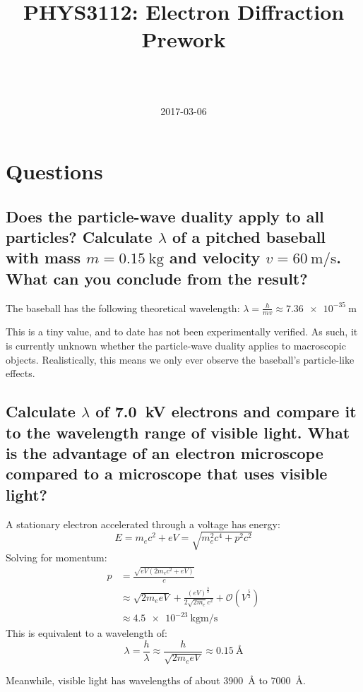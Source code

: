 \documentclass[a4paper]{scrartcl}
\begin{document}
\title{PHYS3112: Electron Diffraction Prework}
\author{ \\ \\ }
\date{2017-03-06}
\maketitle

\section{Questions}
\subsection{Does the particle-wave duality apply to all particles? Calculate \(\lambda\) of a pitched baseball with mass \(m = \SI{0.15}{\kilo\gram}\) and velocity \(v = \SI{60}{\metre\per\second}\). What can you conclude from the result?}
The baseball has the following theoretical wavelength: \(\lambda = \frac{h}{m v} \approx \SI{7.36e-35}{\metre}\)

This is a tiny value, and to date has not been experimentally verified. As such, it is currently unknown whether the particle-wave duality applies to macroscopic objects. Realistically, this means we only ever observe the baseball's particle-like effects.

\subsection{Calculate \(\lambda\) of \SI{7.0}{\kilo\volt} electrons and compare it to the wavelength range of visible light. What is the advantage of an electron microscope compared to a microscope that uses visible light?}
A stationary electron accelerated through a voltage has energy:
\[E = m_e c^2 + e V = \sqrt{m_e^2 c^4 + p^2 c^2}\]
Solving for momentum:
\begin{align*}
    p &= \frac{\sqrt{e V (2 m_e c^2 + e V)}}{c} \\
    &\approx \sqrt{2 m_e e V} + \frac{(e V)^\frac{3}{2}}{2 \sqrt{2 m_e} c^2} + \mathcal{O}\left(V^\frac{5}{2}\right) \\
    &\approx \SI{4.5e-23}{\kilo\gram\metre\per\second}
\end{align*}
This is equivalent to a wavelength of:
\[\lambda = \frac{h}{\lambda} \approx \frac{h}{\sqrt{2 m_e e V}} \approx \SI{0.15}{\angstrom}\]

Meanwhile, visible light has wavelengths of about \SI{3900}{\angstrom} to \SI{7000}{\angstrom}.
\end{document}
